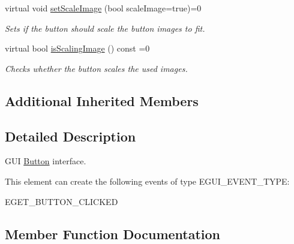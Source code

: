 \begin{DoxyCompactItemize}
\mbox{\label{classirr_1_1gui_1_1IGUIButton_ae0767cb927c7974e19eaa3e5ca52bf1f}} 
virtual void \hyperlink{classirr_1_1gui_1_1IGUIButton_ae0767cb927c7974e19eaa3e5ca52bf1f}{set\+Scale\+Image} (bool scale\+Image=true)=0
\begin{DoxyCompactList}\small\item\em Sets if the button should scale the button images to fit. \end{DoxyCompactList}\item 
\mbox{\label{classirr_1_1gui_1_1IGUIButton_af2660457dae6def0b34d4748e96c653a}} 
virtual bool \hyperlink{classirr_1_1gui_1_1IGUIButton_af2660457dae6def0b34d4748e96c653a}{is\+Scaling\+Image} () const =0
\begin{DoxyCompactList}\small\item\em Checks whether the button scales the used images. \end{DoxyCompactList}\end{DoxyCompactItemize}
\subsection*{Additional Inherited Members}


\subsection{Detailed Description}
G\+UI \hyperlink{classButton}{Button} interface. 

\begin{DoxyParagraph}{This element can create the following events of type E\+G\+U\+I\+\_\+\+E\+V\+E\+N\+T\+\_\+\+T\+Y\+PE\+:}
\begin{DoxyItemize}
\item E\+G\+E\+T\+\_\+\+B\+U\+T\+T\+O\+N\+\_\+\+C\+L\+I\+C\+K\+ED \end{DoxyItemize}

\end{DoxyParagraph}


\subsection{Member Function Documentation}
\mbox{\label{classirr_1_1gui_1_1IGUIButton_a1caa9253c284c3e3366733bf7805d762}} 
